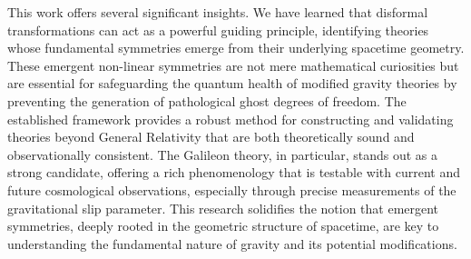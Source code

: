 \documentclass[twocolumn]{aastex631}
\begin{document}
This work offers several significant insights. We have learned that disformal transformations can act as a powerful guiding principle, identifying theories whose fundamental symmetries emerge from their underlying spacetime geometry. These emergent non-linear symmetries are not mere mathematical curiosities but are essential for safeguarding the quantum health of modified gravity theories by preventing the generation of pathological ghost degrees of freedom. The established framework provides a robust method for constructing and validating theories beyond General Relativity that are both theoretically sound and observationally consistent. The Galileon theory, in particular, stands out as a strong candidate, offering a rich phenomenology that is testable with current and future cosmological observations, especially through precise measurements of the gravitational slip parameter. This research solidifies the notion that emergent symmetries, deeply rooted in the geometric structure of spacetime, are key to understanding the fundamental nature of gravity and its potential modifications.

{}

\end{document}

